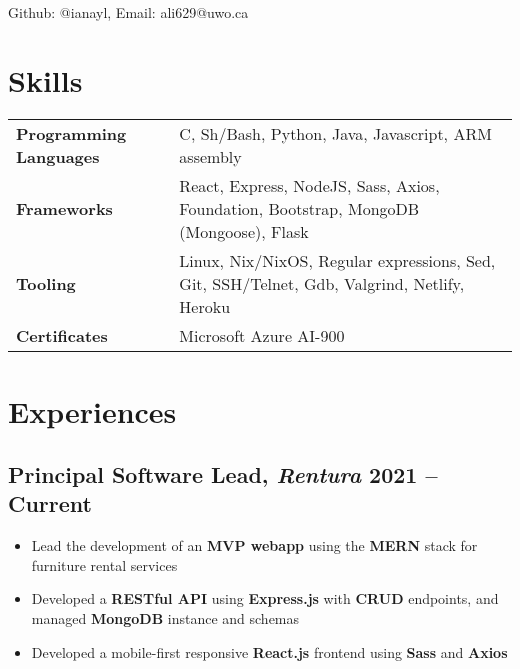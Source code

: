 \documentclass[9pt]{article}
\author{Ian Li}
\makeatletter
\renewcommand{\maketitle}{
		\vspace{-4em}
		{\huge\bfseries
		\theauthor}
    \vspace{0.2em}
    \\
    Github: @ianayl, Email: ali629@uwo.ca
}
\makeatother
\begin{document}
\maketitle


\section{Skills}

\begin{tabular}{ l l }
    \textbf{Programming Languages} & C, Sh/Bash, Python, Java, Javascript, ARM assembly \\
    \textbf{Frameworks} & React, Express, NodeJS, Sass, Axios, Foundation, Bootstrap, MongoDB (Mongoose), Flask \\
    \textbf{Tooling} & Linux, Nix/NixOS, Regular expressions, Sed, Git, SSH/Telnet, Gdb, Valgrind, Netlify, Heroku \\
    \textbf{Certificates} & Microsoft Azure AI-900
\end{tabular}

\section*{Experiences}

\subsection{Principal Software Lead, \textit{Rentura} \hfill \normalsize\textnormal{2021 -- Current}}
\begin{itemize}
    \item Lead the development of an \textbf{MVP webapp} using the \textbf{MERN} stack for furniture rental services
    \item Developed a \textbf{RESTful API} using \textbf{Express.js} with \textbf{CRUD} endpoints, and managed \textbf{MongoDB} instance and schemas 
    \item Developed a mobile-first responsive \textbf{React.js} frontend using \textbf{Sass} and \textbf{Axios}
\end{itemize}
\end{document}
